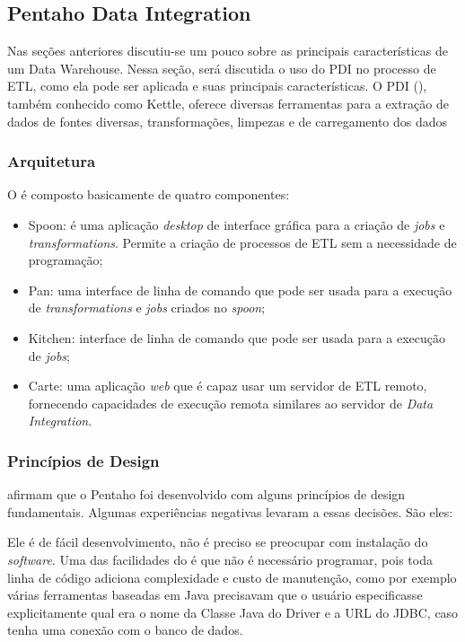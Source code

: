 \subsection{Pentaho Data Integration}
Nas seções anteriores discutiu-se um pouco sobre as principais características de um Data Warehouse. Nessa seção, será discutida o uso do PDI no processo de ETL, como ela pode ser aplicada e suas principais características.
O PDI (\textit{\pdi}), também conhecido como Kettle, oferece diversas ferramentas para a extração de dados de fontes diversas, transformações, limpezas e de carregamento dos dados
\subsubsection{Arquitetura}
O \pdi é composto basicamente de quatro componentes:
\begin{itemize}
    \item Spoon: é uma aplicação \textit{desktop} de interface gráfica para a criação de \textit{jobs} e \textit{transformations}. Permite a criação de processos de ETL sem a necessidade de programação;
    \item Pan: uma interface de linha de comando que pode ser usada para a execução de \textit{transformations} e \textit{jobs} criados no \textit{spoon};
    \item Kitchen: interface de linha de comando que pode ser usada para a execução de \textit{jobs};
    \item Carte: uma aplicação \textit{web} que é capaz usar um servidor de ETL remoto, fornecendo capacidades de execução remota similares ao servidor de \textit{Data Integration}.
\end{itemize}

\subsubsection{Princípios de Design}
 afirmam que o Pentaho foi desenvolvido com alguns princípios de design fundamentais. Algumas experiências negativas levaram a essas decisões. São eles:

Ele é de fácil desenvolvimento, não é preciso se preocupar com instalação do \textit{software}. Uma das facilidades do \pdi é que não é necessário programar, pois toda linha de código adiciona complexidade e custo de manutenção, como por exemplo  várias ferramentas baseadas em Java precisavam que o usuário especificasse explicitamente qual era o nome da Classe Java do Driver e a URL do JDBC, caso tenha uma conexão com o banco de dados. 

